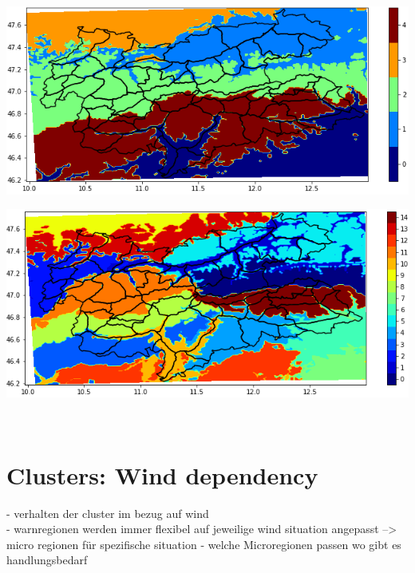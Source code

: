 \begin{minipage}{.5\textwidth}

    \includegraphics[width=\textwidth]{Figures/figures_snowgrid/clusters_analysis_north_5.png}
    \label{fig:5clusters}
    \end{minipage}
    \hfill
    \begin{minipage}{.5\linewidth}
    
    \includegraphics[width=\linewidth]{Figures/figures_snowgrid/clusters_analysis_north_15.png}
    \label{fig:15clusters}
    \end{minipage}
\\





\section{Clusters: Wind dependency}

- verhalten der cluster im bezug auf wind \\
- warnregionen werden immer flexibel auf jeweilige wind situation angepasst --> micro regionen für spezifische situation
- welche Microregionen passen wo gibt es handlungsbedarf \\

